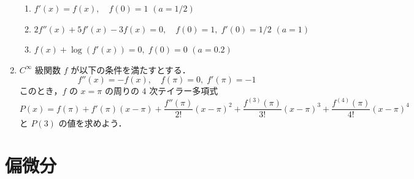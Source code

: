 \documentclass[11pt, uplatex, dvipdfmx, twoside]{jsarticle}
\newcommand{\ds}{\displaystyle}
\begin{document}
\begin{enumerate}[label=\arabic{section}.\arabic*]
  \vspace{1ex}

  \begin{enumerate}[label=(\arabic*)]

    \setlength{\itemsep}{1ex}
    
  \item $f'(x) = f(x), \quad f(0) =1$ \quad $\ds (a=1/2)$

  \item $\ds 2f''(x) +5f'(x) -3 f(x)=0, \quad f(0)=1, \; f'(0)= 1/2$ \quad $(a=1)$

  \item $\ds f(x) + \log\left( f'(x)\right) =0, \; f(0)=0$ \quad $(a=0.2)$
    
  \end{enumerate}

\item $C^{\infty}$ 級関数 $f$ が以下の条件を満たすとする．
  \[
    f''(x) = -f(x), \quad f(\pi)=0, \; f'(\pi) = -1
  \]
  このとき，$f$ の $x=\pi$ の周りの $4$ 次テイラー多項式
  \[
    P(x) = f(\pi) + f'(\pi) (x-\pi) + \frac{f''(\pi)}{2!}(x-\pi)^2 + \frac{f^{(3)}(\pi)}{3!}(x-\pi)^3
    + \frac{f^{(4)}(\pi)}{4!}(x-\pi)^4
  \]
  と $P(3)$ の値を求めよう．
    
\end{enumerate}

\newpage

\section{偏微分}\label{sec:partial}
\end{document}
